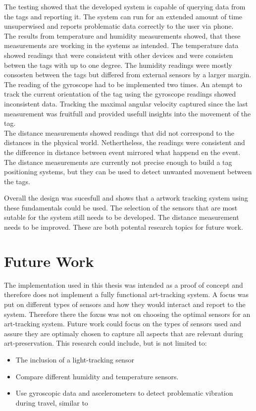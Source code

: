 The testing showed that the developed system is capable of querying data from the tags and reporting it.
The system can run for an extended amount of time unsuperwised and reports problematic data correctly to the user via phone.\\
The results from temperature and humidity measurements showed, that these measurements are working in the systems as intended.
The temperature data showed readings that were consistent with other devices and were consisten betwen the tags with up to one degree.
The humidity readings were mostly consosten between the tags but differed from external sensors by a larger margin.\\
The reading of the gyroscope had to be implemented two times.
An atempt to track the current orientation of the tag using the gyroscope readings showed inconsistent data.
Tracking the maximal angular velocity captured since the last measurement was fruitfull and provided usefull insights into the movement of the tag.\\
The distance measurements showed readings that did not correspond to the distances in the physical world.
Nethertheless, the readings were consistent and the difference in distance between event mirrored what happend en the event.
The distance measurements are currently not precise enough to build a tag positioning systems, but they can be used to detect unwanted movement between the tags.


Overall the design was sucesfull and shows that a artwork tracking system using these fundamentals could be used.
The selection of the sensors that are most sutable for the system still needs to be developed.
The distance measurement needs to be improved.
These are both potental research topics for future work.

\section{Future Work}
\label{s:future_work}

The implementation used in this thesis was intended as a proof of concept and therefore does not implement a fully functional art-tracking system.
A focus was put on different types of sensors and how they would interact and report to the system.
Therefore there the foxus was not on choosing the optimal sensors for an art-tracking system.
Future work could focus on the types of sensors used and assure they are optimaly chosen to capture all aspects that are relevant during art-preservation.
This research could include, but is not limited to:
\begin{itemize}
	\item The inclusion of a light-tracking sensor
	\item Compare different humidity and temperature sensors.
	\item Use gyroscopic data and ascelerometers to detect problematic vibration during travel, similar to \cite{landi2022iot}
\end{itemize}